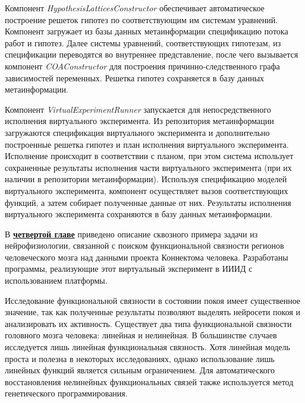 Компонент \textit{HypothesisLatticesConstructor} обеспечивает автоматическое построение решеток гипотез по соответствующим 
им системам уравнений. Компонент загружает из базы данных метаинформации спецификацию потока работ и гипотез. 
Далее системы уравнений, соответствующих гипотезам, из спецификации переводятся во внутреннее представление, 
после чего вызывается компонент \textit{COAConstructor} для построения причинно-следственного графа зависимостей переменных. 
Решетка гипотез сохраняется в базу данных метаинформации.

Компонент \textit{VirtualExperimentRunner} запускается для непосредственного исполнения виртуального эксперимента. 
Из репозитория метаинформации загружаются спецификация виртуального эксперимента и дополнительно построенные 
решетка гипотез и план исполнения виртуального эксперимента. Исполнение происходит в соответствии с планом, при 
этом система использует сохраненные результаты исполнения части виртуального эксперимента (при их наличии в 
репозитории метаинформации). Используя спецификацию моделей виртуального эксперимента, компонент осуществляет 
вызов соответствующих функций, а затем собирает полученные данные от них. Результаты исполнения виртуального 
эксперимента сохраняются в базу данных метаинформации.



В \underline{\textbf{четвертой главе}} приведено описание сквозного примера задачи из нейрофизиологии,
связанной с поиском функциональной связности регионов человеческого мозга над данными проекта Коннектома человека.
Разработаны программы, реализующие этот виртуальный эксперимент в ИИИД с использованием платформы.

Исследование функциональной связности в состоянии покоя имеет существенное значение, так как полученные результаты 
позволяют выделять нейросети покоя и анализировать их активность. Существует два типа функциональной связности 
головного мозга человека: линейная и нелинейная. В большинстве 
случаев исследуется лишь линейная функциональная связность. Хотя линейная модель проста и полезна в некоторых 
исследованиях, однако использование лишь линейных функций является сильным ограничением. Для автоматического 
восстановления нелинейных функциональных связей также используется метод генетического 
программирования. 

